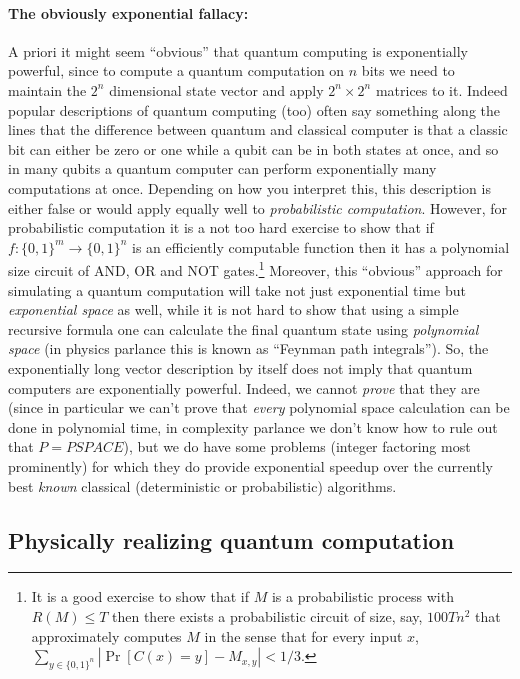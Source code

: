 \paragraph{The obviously exponential fallacy:} A priori it might seem
``obvious'' that quantum computing is exponentially powerful, since to
compute a quantum computation on \(n\) bits we need to maintain the
\(2^n\) dimensional state vector and apply \(2^n\times 2^n\) matrices to
it. Indeed popular descriptions of quantum computing (too) often say
something along the lines that the difference between quantum and
classical computer is that a classic bit can either be zero or one while
a qubit can be in both states at once, and so in many qubits a quantum
computer can perform exponentially many computations at once. Depending
on how you interpret this, this description is either false or would
apply equally well to \emph{probabilistic computation}. However, for
probabilistic computation it is a not too hard exercise to show that if
\(f:\{0,1\}^m\rightarrow\{0,1\}^n\) is an efficiently computable
function then it has a polynomial size circuit of AND, OR and NOT
gates.\footnote{It is a good exercise to show that if \(M\) is a
  probabilistic process with \(R(M) \leq T\) then there exists a
  probabilistic circuit of size, say, \(100 T n^2\) that approximately
  computes \(M\) in the sense that for every input \(x\),
  \(\sum_{y\in\{0,1\}^n} \left| \Pr[C(x)=y] - M_{x,y} \right| < 1/3\).}
Moreover, this ``obvious'' approach for simulating a quantum computation
will take not just exponential time but \emph{exponential space} as
well, while it is not hard to show that using a simple recursive formula
one can calculate the final quantum state using \emph{polynomial space}
(in physics parlance this is known as ``Feynman path integrals''). So,
the exponentially long vector description by itself does not imply that
quantum computers are exponentially powerful. Indeed, we cannot
\emph{prove} that they are (since in particular we can't prove that
\emph{every} polynomial space calculation can be done in polynomial
time, in complexity parlance we don't know how to rule out that
\(P=\ensuremath{\mathit{PSPACE}}\)), but we do have some problems
(integer factoring most prominently) for which they do provide
exponential speedup over the currently best \emph{known} classical
(deterministic or probabilistic) algorithms.

\subsection{Physically realizing quantum
computation}\label{Physically-realizing-quan}

